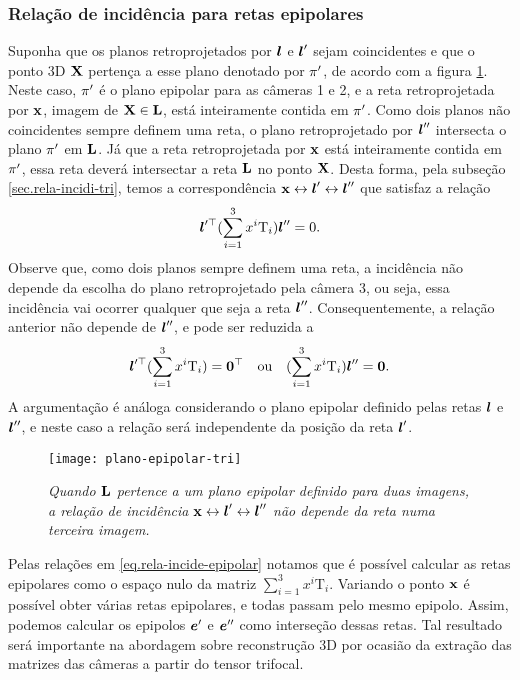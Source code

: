 \subsubsection{Relação de incidência para retas epipolares}\label{sec.rela-reta-epipolar-tri}
Suponha que os planos retroprojetados por $\boldsymbol{l}$ e $\boldsymbol{l}'$ sejam coincidentes e que o ponto 3D $\mathbf{X}$ pertença a esse plano denotado por $\pi'$, de acordo com a figura \ref{fig.plano-epipolar-tri}. Neste caso, $\pi'$ é o plano epipolar para as câmeras 1 e 2, e a reta retroprojetada por $\mathbf{x}$, imagem de $\mathbf{X}\in{\bf L}$, está inteiramente contida em $\pi'$. Como dois planos não coincidentes sempre definem uma reta, o plano retroprojetado por $\boldsymbol{l}''$ intersecta o plano $\pi'$ em ${\bf L}$. Já que a reta retroprojetada por $\mathbf{x}$ está inteiramente contida em $\pi'$, essa reta deverá intersectar a reta ${\bf L}$ no ponto $\mathbf{X}$. Desta forma, pela subseção \ref{sec.rela-incidi-tri}, temos a correspondência $\mathbf{x}\leftrightarrow\boldsymbol{l}'\leftrightarrow\boldsymbol{l}''$ que satisfaz a relação
\begin{equation*}
\boldsymbol{l}'^\top(\sum_{i=1}^3 x^i\mbox{T}_i)\boldsymbol{l}''=0.
\end{equation*}
Observe que, como dois planos sempre definem uma reta, a incidência não depende da escolha do plano retroprojetado pela câmera 3, ou seja, essa incidência vai ocorrer qualquer que seja a reta $\boldsymbol{l}''$. Consequentemente, a relação anterior não depende de $\boldsymbol{l}''$, e pode ser reduzida a 
\begin{equation}\label{eq.rela-incide-epipolar}
\boldsymbol{l}'^\top(\sum_{i=1}^3 x^i\mbox{T}_i)={\bf 0}^\top\quad\text{ou}\quad(\sum_{i=1}^3 x^i\mbox{T}_i)\boldsymbol{l}''={\bf 0}.
\end{equation}
A argumentação é análoga considerando o plano epipolar definido pelas retas $\boldsymbol{l}$ e $\boldsymbol{l}''$, e neste caso a relação será independente da posição da reta $\boldsymbol{l}'$. 
\begin{figure}[!htb]
\centering
\texttt{[image: plano-epipolar-tri]}
\caption{{\it Quando ${\bf L}$ pertence a um plano epipolar definido para duas imagens, a relação de incidência $\mathbf{x}\leftrightarrow\boldsymbol{l}'\leftrightarrow\boldsymbol{l}''$ não depende da reta numa terceira imagem.}}
\label{fig.plano-epipolar-tri}
\end{figure}

Pelas relações em \ref{eq.rela-incide-epipolar} notamos que é possível calcular as retas epipolares como o espaço nulo da matriz $\sum_{i=1}^3 x^i \mbox{T}_i$. Variando o ponto $\mathbf{x}$ é possível obter várias retas epipolares, e todas passam pelo mesmo epipolo. Assim, podemos calcular os epipolos $\boldsymbol{e}'$ e $\boldsymbol{e}''$ como interseção dessas retas. Tal resultado será importante na abordagem sobre reconstrução 3D por ocasião da extração das matrizes das câmeras a partir do tensor trifocal.

